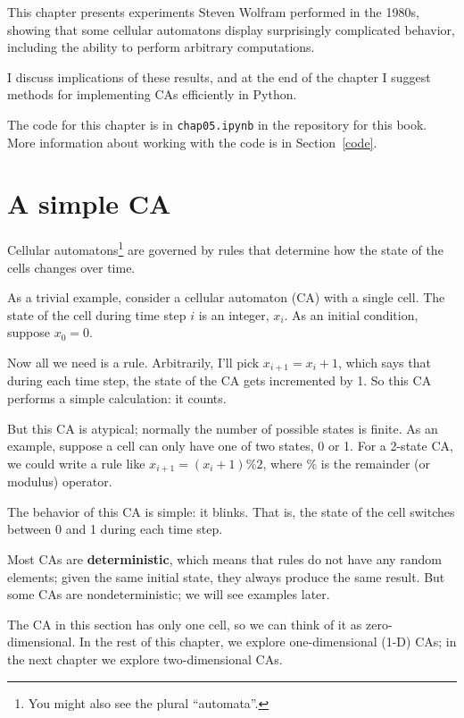 \documentclass[12pt]{book}
\theoremstyle{exercise}
\begin{document}
This chapter presents experiments Steven Wolfram performed
in the 1980s, showing that some cellular automatons display
surprisingly complicated behavior, including the ability to
perform arbitrary computations.


I discuss implications of these results, and at the end of the
chapter I suggest methods for implementing CAs efficiently in Python.

The code for this chapter is in {\tt chap05.ipynb} in the repository
for this book.  More information about working with the code is
in Section~\ref{code}.


\section{A simple CA}

Cellular automatons\footnote{You might also see the plural
  ``automata''.} are governed by rules that determine how the state of
the cells changes over time.


As a trivial example, consider a cellular automaton (CA) with
a single cell.  The state of the cell during time step $i$ is an integer, $x_i$.  As an initial condition, suppose $x_0 = 0$.


Now all we need is a rule.  Arbitrarily, I'll pick $x_{i+1} = x_{i} + 1$,
which says that during each time step, the state of the CA gets
incremented by 1.  So this CA performs a simple calculation: it counts.


But this CA is atypical; normally the number of
possible states is finite.  As an example, suppose a cell can only have one of two states, 0 or 1.  For a 2-state CA, we could write a rule like
$x_{i+1} = (x_{i} + 1) \% 2$, where $\%$ is the remainder (or
modulus) operator.

The behavior of this CA is simple: it blinks.  That is,
the state of the cell switches between 0 and 1 during each time step.

Most CAs are {\bf deterministic}, which means that rules do not
have any random elements; given the same initial state, they
always produce the same result.  But some CAs are nondeterministic;
we will see examples later.


The CA in this section has only one cell, so we can think of
it as zero-dimensional.  In the rest
of this chapter, we explore one-dimensional (1-D) CAs; in the next chapter
we explore two-dimensional CAs.
\end{document}
